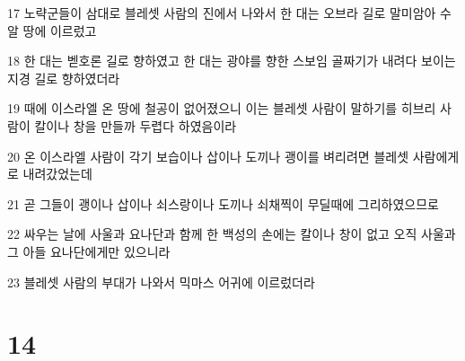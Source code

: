 \par 17 노략군들이 삼대로 블레셋 사람의 진에서 나와서 한 대는 오브라 길로 말미암아 수알 땅에 이르렀고
\par 18 한 대는 벧호론 길로 향하였고 한 대는 광야를 향한 스보임 골짜기가 내려다 보이는 지경 길로 향하였더라
\par 19 때에 이스라엘 온 땅에 철공이 없어졌으니 이는 블레셋 사람이 말하기를 히브리 사람이 칼이나 창을 만들까 두렵다 하였음이라
\par 20 온 이스라엘 사람이 각기 보습이나 삽이나 도끼나 괭이를 벼리려면 블레셋 사람에게로 내려갔었는데
\par 21 곧 그들이 괭이나 삽이나 쇠스랑이나 도끼나 쇠채찍이 무딜때에 그리하였으므로
\par 22 싸우는 날에 사울과 요나단과 함께 한 백성의 손에는 칼이나 창이 없고 오직 사울과 그 아들 요나단에게만 있으니라
\par 23 블레셋 사람의 부대가 나와서 믹마스 어귀에 이르렀더라

\chapter{14}

